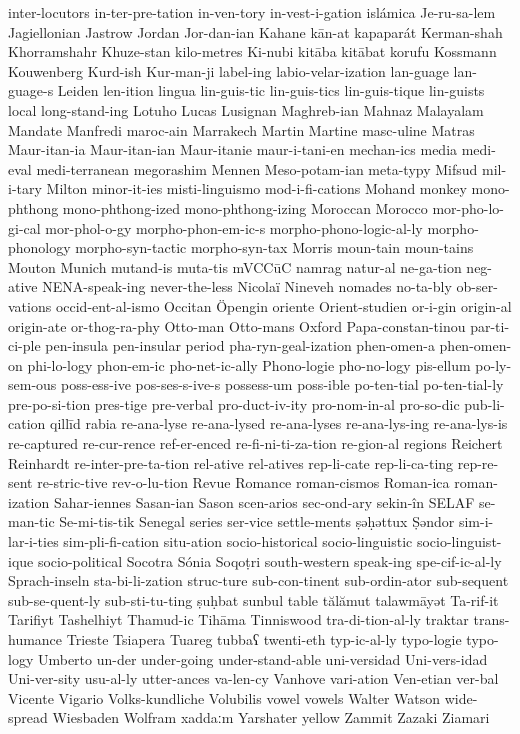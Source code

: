 {inter-locutors
in-ter-pre-tation
in-ven-tory
in-vest-i-gation
islámica
Je-ru-sa-lem
Jagiellonian
Jastrow
Jordan
Jor-dan-ian
Kahane
kān-at
kapaparát
Kerman-shah
Khorramshahr
Khuze-stan
kilo-metres
Ki-nubi
kitāba
kitābat
korufu
Kossmann
Kouwenberg
Kurd-ish
Kur-man-ji
label-ing
labio-velar-ization
lan-guage
lan-guage-s
Leiden
len-ition
lingua
lin-guis-tic
lin-guis-tics
lin-guis-tique
lin-guists
local
long-stand-ing
Lotuho
Lucas
Lusignan
Maghreb-ian
Mahnaz
Malayalam
Mandate
Manfredi
maroc-ain
Marrakech
Martin
Martine
masc-uline
Matras
Maur-itan-ia
Maur-itan-ian
Maur-itanie
maur-i-tani-en
mechan-ics
media
medi-eval
medi-terranean
megorashim
Mennen
Meso-potam-ian
meta-typy
Mifsud
mil-i-tary
Milton
minor-it-ies
misti-linguismo
mod-i-fi-cations
Mohand
monkey
mono-phthong
mono-phthong-ized
mono-phthong-izing
Moroccan
Morocco
mor-pho-lo-gi-cal
mor-phol-o-gy
morpho-phon-em-ic-s
morpho-phono-logic-al-ly
morpho-phonology
morpho-syn-tactic
morpho-syn-tax
Morris
moun-tain
moun-tains
Mouton
Munich
mutand-is
muta-tis
mVCCūC
namrag
natur-al
ne-ga-tion
neg-ative
NENA-speak-ing
never-the-less
Nicolaï
Nineveh
nomades
no-ta-bly
ob-ser-vations
occid-ent-al-ismo
Occitan
Öpengin
oriente
Orient-studien
or-i-gin
origin-al
origin-ate
or-thog-ra-phy
Otto-man
Otto-mans
Oxford
Papa-constan-tinou
par-ti-ci-ple
pen-insula
pen-insular
period
pha-ryn-geal-ization
phen-omen-a
phen-omen-on
phi-lo-logy
phon-em-ic
pho-net-ic-ally
Phono-logie
pho-no-logy
pis-ellum
po-ly-sem-ous
poss-ess-ive
pos-ses-s-ive-s
possess-um
poss-ible
po-ten-tial
po-ten-tial-ly
pre-po-si-tion
pres-tige
pre-verbal
pro-duct-iv-ity
pro-nom-in-al
pro-so-dic
pub-li-cation
qillīd
rabia
re-ana-lyse
re-ana-lysed
re-ana-lyses
re-ana-lys-ing
re-ana-lys-is
re-captured
re-cur-rence
ref-er-enced
re-fi-ni-ti-za-tion
re-gion-al
regions
Reichert
Reinhardt
re-inter-pre-ta-tion
rel-ative
rel-atives
rep-li-cate
rep-li-ca-ting
rep-re-sent
re-stric-tive
rev-o-lu-tion
Revue
Romance
roman-cismos
Roman-ica
roman-ization
Sahar-iennes
Sasan-ian
Sason
scen-arios
sec-ond-ary
sekin-în
SELAF
se-man-tic
Se-mi-tis-tik
Senegal
series
ser-vice
settle-ments
ṣəḥəttux
Ṣəndor
sim-i-lar-i-ties
sim-pli-fi-cation
situ-ation
socio-historical
socio-linguistic
socio-linguist-ique
socio-political
Socotra
Sónia
Soqoṭri
south-western
speak-ing
spe-cif-ic-al-ly
Sprach-inseln
sta-bi-li-zation
struc-ture
sub-con-tinent
sub-ordin-ator
sub-sequent
sub-se-quent-ly
sub-sti-tu-ting
ṣuḥbat
sunbul
table
tălămut
talawmāyət
Ta-rif-it
Tarifiyt
Tashelhiyt
Thamud-ic
Tihāma
Tinniswood
tra-di-tion-al-ly
traktar
trans-humance
Trieste
Tsiapera
Tuareg
tubbaʕ
twenti-eth
typ-ic-al-ly
typo-logie
typo-logy
Umberto
un-der
under-going
under-stand-able
uni-versidad
Uni-vers-idad
Uni-ver-sity
usu-al-ly
utter-ances
va-len-cy
Vanhove
vari-ation
Ven-etian
ver-bal
Vicente
Vigario
Volks-kundliche
Volubilis
vowel
vowels
Walter
Watson
wide-spread
Wiesbaden
Wolfram
xaddaːm
Yarshater
yellow
Zammit
Zazaki
Ziamari
}
